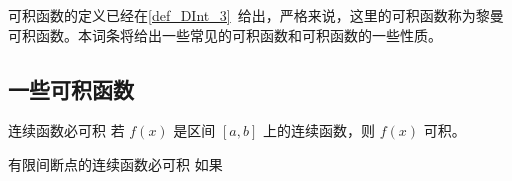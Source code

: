 可积函数的定义已经在\autoref{def_DInt_3}~给出，严格来说，这里的可积函数称为黎曼可积函数。本词条将给出一些常见的可积函数和可积函数的一些性质。
\subsection{一些可积函数}
\begin{theorem}{连续函数必可积}
若 $f(x)$ 是区间 $[a,b]$ 上的连续函数，则 $f(x)$ 可积。
\end{theorem}


\begin{theorem}{有限间断点的连续函数必可积}
如果
\end{theorem}